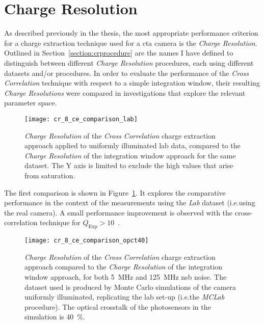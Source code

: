 \section{Charge Resolution}

As described previously in the thesis, the most appropriate performance criterion for a charge extraction technique used for a \gls{cta} camera is the \textit{Charge Resolution}. Outlined in Section~\ref{section:crprocedure} are the names I have defined to distinguish between different \textit{Charge Resolution} procedures, each using different datasets and/or procedures. In order to evaluate the performance of the \textit{Cross Correlation} technique with respect to a simple integration window, their resulting \textit{Charge Resolutions} were compared in investigations that explore the relevant parameter space.

\begin{figure}
  \texttt{[image: cr\_8\_ce\_comparison\_lab]}
  \caption[\textit{Charge Resolution} comparison between \textit{Cross Correlation} and \textit{Window Integration} for \textit{Lab} data.]{\textit{Charge Resolution} of the \textit{Cross Correlation} charge extraction approach applied to uniformly illuminated lab data, compared to the \textit{Charge Resolution} of the integration window approach for the same dataset. The Y axis is limited to exclude the high values that arise from saturation.}
  \label{fig:cr_8_ce_comparison_lab}
\end{figure}

The first comparison is shown in Figure~\ref{fig:cr_8_ce_comparison_lab}. It explores the comparative performance in the context of the measurements using the \textit{Lab} dataset (i.e.\@ using the real camera). A small performance improvement is observed with the cross-correlation technique for $Q_\text{Exp} > 10$~\si{\pe}.

\begin{figure}
  \texttt{[image: cr\_8\_ce\_comparison\_opct40]}
  \caption[\textit{Charge Resolution} comparison between \textit{Cross Correlation} and \textit{Window Integration} for \textit{MCLab} data with an optical crosstalk of \SI{40}{\percent}.]{\textit{Charge Resolution} of the \textit{Cross Correlation} charge extraction approach compared to the \textit{Charge Resolution} of the integration window approach, for both \SI{5}{MHz} and \SI{125}{MHz} \gls{nsb} noise. The dataset used is produced by Monte Carlo simulations of the camera uniformly illuminated, replicating the lab set-up (i.e.\@ the \textit{MCLab} procedure). The optical crosstalk of the photosensors in the simulation is \SI{40}{\percent}.}
  \label{fig:cr_8_ce_comparison_opct40}
\end{figure}

